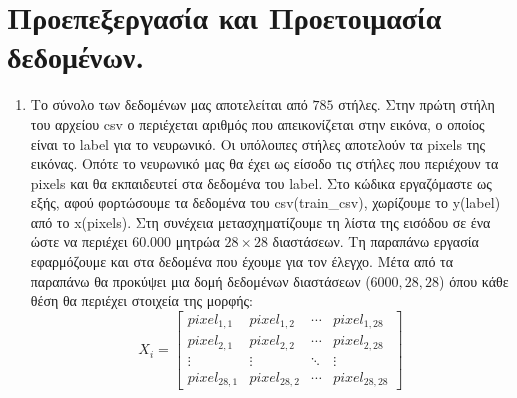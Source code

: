 \documentclass[12pt,a4paper]{article}
\newcommand{\tl}{\textlatin}
\begin{document}
    \section{Προεπεξεργασία και Προετοιμασία δεδομένων.} 
    \begin{enumerate}
        \item 
        Το σύνολο των δεδομένων μας αποτελείται από $785$ στήλες. Στην πρώτη στήλη του αρχείου \tl{csv} ο περιέχεται αριθμός που απεικονίζεται στην εικόνα, ο οποίος είναι το  \tl{label} για το νευρωνικό. Οι υπόλοιπες στήλες αποτελούν τα \tl{pixels} της εικόνας. Οπότε το νευρωνικό μας θα έχει ως είσοδο τις στήλες που περιέχουν τα \tl{pixels} και θα εκπαιδευτεί στα δεδομένα του \tl{label}. Στο κώδικα εργαζόμαστε ως εξής, αφού φορτώσουμε τα δεδομένα του \tl{csv(train\_csv)}, χωρίζουμε το \tl{y(label)} από το \tl{x(pixels)}. Στη συνέχεια μετασχηματίζουμε τη λίστα της εισόδου σε ένα ώστε να περιέχει $60.000$ μητρώα $28\times28$ διαστάσεων. Τη παραπάνω εργασία εφαρμόζουμε και στα δεδομένα που έχουμε για τον έλεγχο. Μέτα από τα παραπάνω θα προκύψει μια δομή δεδομένων διαστάσεων ($6000,28,28$) όπου κάθε θέση θα περιέχει στοιχεία της μορφής:
        \begin{equation*}
        X_i = 
        \begin{bmatrix}
            pixel_{1,1} & pixel_{1,2} & \cdots & pixel_{1,28} \\
            pixel_{2,1} & pixel_{2,2} & \cdots & pixel_{2,28} \\
            \vdots      & \vdots      & \ddots & \vdots  \\
            pixel_{28,1} & pixel_{28,2} & \cdots & pixel_{28,28} 
        \end{bmatrix} 
        \end{equation*}

\end{enumerate}
\end{document}

